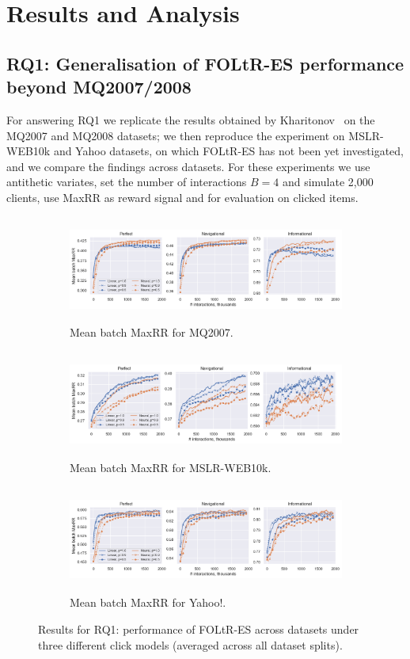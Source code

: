 \section{Results and Analysis}

\subsection{RQ1: Generalisation of FOLtR-ES performance beyond MQ2007/2008}
For answering RQ1 we replicate the results obtained by Kharitonov~\cite{kharitonov2019federated} on the MQ2007 and MQ2008 datasets; we then reproduce the experiment on MSLR-WEB10k and Yahoo datasets, on which FOLtR-ES has not been yet investigated, and we compare the findings across datasets. For these experiments we use antithetic variates, set the number of interactions $B = 4$ and simulate 2,000 clients, use MaxRR as reward signal and for evaluation on clicked items. 

\begin{figure}[t]
	\centering
	\begin{subfigure}{1\textwidth}
		\centering
		\includegraphics[width=13cm, height=3.5cm]{images/RQ1/mq2007_foltr_c2000_ps.png}
		\caption{Mean batch MaxRR for MQ2007.}
		\label{fig:mq2007-rq1}
	\end{subfigure}
	\begin{subfigure}{1\textwidth} \centering
		\includegraphics[width=13cm, height=3.5cm]{images/RQ1/mslr10k_foltr_c2000_ps.png}
		\caption{Mean batch MaxRR for MSLR-WEB10k.}
		\label{fig:mslr10k-rq1}
	\end{subfigure}
	\begin{subfigure}{1\textwidth} \centering
		\includegraphics[width=13cm, height=3.5cm]{images/RQ1/yahoo_foltr_c2000_ps.png}
		\caption{Mean batch MaxRR for Yahoo!.}
		\label{fig:yahoo-rq1}
	\end{subfigure}
	\caption{Results for RQ1: performance of FOLtR-ES across datasets under three different click models (averaged across all dataset splits). \label{fig:RQ1}}
\end{figure}

